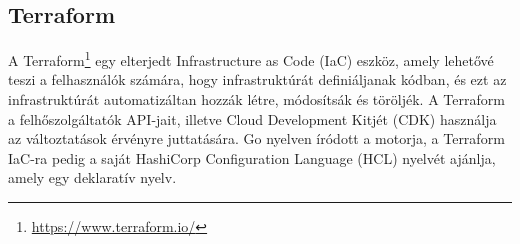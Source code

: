 \subsection{Terraform}

A Terraform\footnote{\url{https://www.terraform.io/}} egy elterjedt Infrastructure as Code (IaC) eszköz, amely lehetővé teszi a felhasználók számára, hogy infrastruktúrát definiáljanak kódban, és ezt az infrastruktúrát automatizáltan hozzák létre, módosítsák és töröljék. A Terraform a felhőszolgáltatók API-jait, illetve Cloud Development Kitjét (CDK) használja az változtatások érvényre juttatására. Go nyelven íródott a motorja, a Terraform IaC-ra pedig a saját HashiCorp Configuration Language (HCL) nyelvét ajánlja, amely egy deklaratív nyelv.
